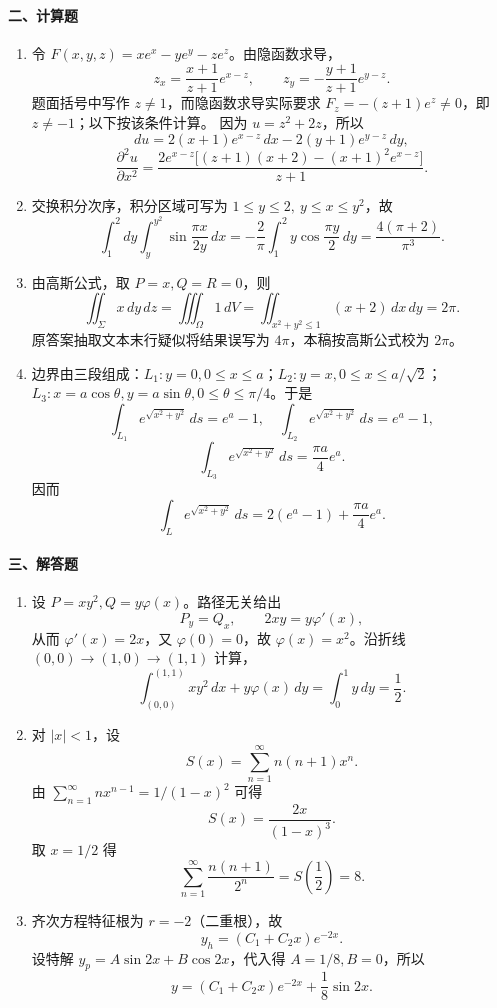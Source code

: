 \paragraph{二、计算题}
\begin{enumerate}
  \item 令 $F(x,y,z)=xe^x-ye^y-ze^z$。由隐函数求导，
  \[
    z_x=\frac{x+1}{z+1}e^{x-z},\qquad
    z_y=-\frac{y+1}{z+1}e^{y-z}.
  \]
  题面括号中写作 $z\ne 1$，而隐函数求导实际要求 $F_z=-(z+1)e^z\ne0$，即 $z\ne-1$；以下按该条件计算。
  因为 $u=z^2+2z$，所以
  \[
    du=2(x+1)e^{x-z}\,dx-2(y+1)e^{y-z}\,dy,
  \]
  \[
    \frac{\partial^2u}{\partial x^2}
    =
    \frac{2e^{x-z}\bigl[(z+1)(x+2)-(x+1)^2e^{x-z}\bigr]}{z+1}.
  \]
  \item 交换积分次序，积分区域可写为 $1\le y\le 2,\ y\le x\le y^2$，故
  \[
    \int_1^2 dy\int_y^{y^2}\sin\frac{\pi x}{2y}\,dx
    =-\frac{2}{\pi}\int_1^2 y\cos\frac{\pi y}{2}\,dy
    =\frac{4(\pi+2)}{\pi^3}.
  \]
  \item 由高斯公式，取 $P=x,Q=R=0$，则
  \[
    \iint_\Sigma x\,dy\,dz=\iiint_\Omega 1\,dV
    =\iint_{x^2+y^2\le 1}(x+2)\,dx\,dy=2\pi.
  \]
  原答案抽取文本末行疑似将结果误写为 $4\pi$，本稿按高斯公式校为 $2\pi$。
  \item 边界由三段组成：$L_1:y=0,0\le x\le a$；$L_2:y=x,0\le x\le a/\sqrt2$；$L_3:x=a\cos\theta,y=a\sin\theta,0\le\theta\le\pi/4$。于是
  \[
    \int_{L_1}e^{\sqrt{x^2+y^2}}\,ds=e^a-1,\quad
    \int_{L_2}e^{\sqrt{x^2+y^2}}\,ds=e^a-1,
  \]
  \[
    \int_{L_3}e^{\sqrt{x^2+y^2}}\,ds=\frac{\pi a}{4}e^a.
  \]
  因而
  \[
    \int_L e^{\sqrt{x^2+y^2}}\,ds=2(e^a-1)+\frac{\pi a}{4}e^a.
  \]
\end{enumerate}

\paragraph{三、解答题}
\begin{enumerate}
  \item 设 $P=xy^2,Q=y\varphi(x)$。路径无关给出
  \[
    P_y=Q_x,\qquad 2xy=y\varphi'(x),
  \]
  从而 $\varphi'(x)=2x$，又 $\varphi(0)=0$，故 $\varphi(x)=x^2$。沿折线 $(0,0)\to(1,0)\to(1,1)$ 计算，
  \[
    \int_{(0,0)}^{(1,1)} xy^2\,dx+y\varphi(x)\,dy
    =\int_0^1 y\,dy=\frac12.
  \]
  \item 对 $|x|<1$，设
  \[
    S(x)=\sum_{n=1}^\infty n(n+1)x^n.
  \]
  由 $\sum_{n=1}^\infty nx^{n-1}=1/(1-x)^2$ 可得
  \[
    S(x)=\frac{2x}{(1-x)^3}.
  \]
  取 $x=1/2$ 得
  \[
    \sum_{n=1}^\infty \frac{n(n+1)}{2^n}=S\left(\frac12\right)=8.
  \]
  \item 齐次方程特征根为 $r=-2$（二重根），故
  \[
    y_h=(C_1+C_2x)e^{-2x}.
  \]
  设特解 $y_p=A\sin 2x+B\cos 2x$，代入得 $A=1/8,B=0$，所以
  \[
    y=(C_1+C_2x)e^{-2x}+\frac18\sin 2x.
  \]
\end{enumerate}

